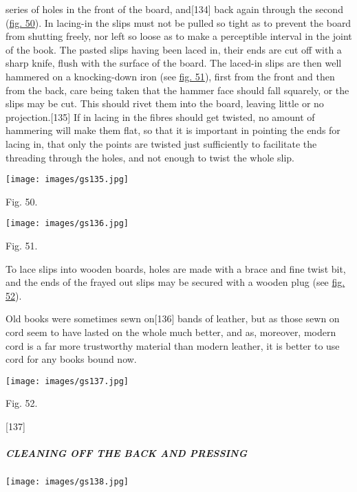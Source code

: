 \documentclass[
]{article}
\begin{document}
series of holes in the front of the board,
and{\protect\hypertarget{Page_134}{}{{[}134{]}}} back again through the
second (\protect\hyperlink{Fig_50}{fig. 50}). In lacing-in the slips
must not be pulled so tight as to prevent the board from shutting
freely, nor left so loose as to make a perceptible interval in the joint
of the book. The pasted slips having been laced in, their ends are cut
off with a sharp knife, flush with the surface of the board. The
laced-in slips are then well hammered on a knocking-down iron (see
\protect\hyperlink{Fig_51}{fig. 51}), first from the front and then from
the back, care being taken that the hammer face should fall squarely, or
the slips may be cut. This should rivet them into the board, leaving
little or no projection.{\protect\hypertarget{Page_135}{}{{[}135{]}}} If
in lacing in the fibres should get twisted, no amount of hammering will
make them flat, so that it is important in pointing the ends for lacing
in, that only the points are twisted just sufficiently to facilitate the
threading through the holes, and not enough to twist the whole slip.

\protect\hypertarget{Fig_50}{}{}
\texttt{[image: images/gs135.jpg]}

Fig. 50.

\protect\hypertarget{Fig_51}{}{}
\texttt{[image: images/gs136.jpg]}

Fig. 51.

To lace slips into wooden boards, holes are made with a brace and fine
twist bit, and the ends of the frayed out slips may be secured with a
wooden plug (see \protect\hyperlink{Fig_52}{fig. 52}).

Old books were sometimes sewn
on{\protect\hypertarget{Page_136}{}{{[}136{]}}} bands of leather, but as
those sewn on cord seem to have lasted on the whole much better, and as,
moreover, modern cord is a far more trustworthy material than modern
leather, it is better to use cord for any books bound now.

\protect\hypertarget{Fig_52}{}{}
\texttt{[image: images/gs137.jpg]}

Fig. 52.

{\protect\hypertarget{Page_137}{}{{[}137{]}}}

\hypertarget{cleaning-off-the-back-and-pressing}{%
\subparagraph{CLEANING OFF THE BACK AND
PRESSING}\label{cleaning-off-the-back-and-pressing}}

\protect\hypertarget{Fig_53}{}{}
\texttt{[image: images/gs138.jpg]}
\end{document}
